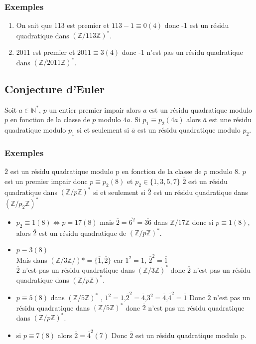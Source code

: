 \documentclass[a4paper,10pt]{book} %
\newcommand{\N}{\mathbb{N}}
\newcommand{\Z}{\mathbb{Z}}
\begin{document}
\subsubsection{Exemples}
\begin{enumerate}
\item On sait que 113 est premier et $113-1\equiv 0(4)$ donc -1 est un résidu quadratique dans $(\Z/113\Z)^*$.

\item 2011 est premier et $2011\equiv 3(4)$ donc -1 n'est pas un résidu quadratique dans $(\Z/2011\Z)^*$.
\end{enumerate}

\subsection{Conjecture d'Euler} %
Soit $a\in \N^*$, $p$ un entier premier impair alors $a$ est un résidu quadratique modulo $p$ en fonction de la classe de $p$ modulo $4a$.
Si $p_1\equiv p_2(4a)$ alors $\overline{a}$ est une résidu quadratique modulo $p_1$ si et seulement si $\overline{a}$ est un résidu quadratique modulo $p_2$.

\subsubsection{Exemples}
$\overline{2}$ est un résidu quadratique modulo p en fonction de la classe de $p$ modulo 8. $p$ est un premier impair donc $p\equiv p_2(8)$ et $p_2\in \{1,3,5,7\}$
$\overline{2}$ est un résidu quadratique dans $(\Z/p\Z)^*$ si et seulement si $\overline{2}$ est un résidu quadratique dans $(\Z/p_2\Z)^*$
\begin{itemize}
\item $p_2\equiv 1(8) \Leftrightarrow p=17(8)$ mais $\overline{2}=\overline{6^2}=\overline{36}$ dans $\Z/17\Z$ donc si $p\equiv 1(8)$, alors $\overline{2}$ est un résidu quadratique de $(\Z/p\Z)^*$.

\item $p \equiv 3(8)$ \\    
Mais dans $(\Z/3\Z/)* = \{\overline{1},\overline{2}\}$ car $1^2 = 1$, $\overline{2}^2=\overline{1}$\\
$\overline{2}$ n'est pas un résidu quadratique dans $(\Z/3\Z)^*$ donc $\overline{2}$ n'est pas un résidu quadratique dans $(\Z/p\Z)^*$.
\item $p \equiv 5(8)$ dans $(\Z/5\Z)^*$ , $1^2=1$,$\overline{2}^2=\overline{4}$,$3^2 =\overline{4}$,$\overline{4}^2=\overline{1}$ Donc $\overline{2}$ n'est pas un résidu quadratique dans $(\Z/5\Z)^*$ donc $\overline{2}$ n'est pas un résidu quadratique dans $(\Z/p\Z)^*$.
\item si $p\equiv 7 (8)$ alors $\overline{2}=\overline{4}^2 (7)$ Donc $\overline{2}$ est un résidu quadratique modulo p.\\ 
\end{itemize}
\end{document}
